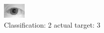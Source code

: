\begin{figure}[h!]
\begin{center}
\includegraphics[width=0.60\columnwidth]{figures/ID1141_class_2_target_3.png}
\end{center}
\caption{ Classification: 2 actual target: 3}
\label{fig:ID1141_class_2_target_3}
\end{figure}
